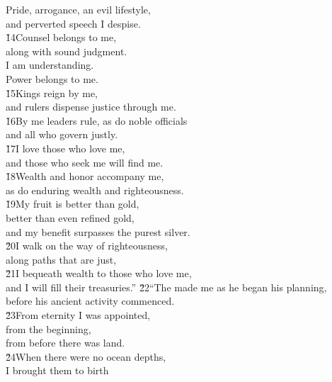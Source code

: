 \begin{poetry}
\poemll    Pride, arrogance, an evil lifestyle, \\
\poemlll       and perverted speech I despise. \\
\poeml \v{14}Counsel belongs to me, \\
\poemll    along with sound judgment. \\
\poeml I am understanding. \\
\poemll    Power belongs to me. \\
\poeml \v{15}Kings reign by me, \\
\poemll    and rulers dispense justice through me. \\
\poeml \v{16}By me leaders rule, as do noble officials \\
\poemll    and all who govern justly. \\
\poeml \v{17}I love those who love me, \\
\poemll    and those who seek me will find me. \\
\poeml \v{18}Wealth and honor accompany me, \\
\poemll    as do enduring wealth and righteousness. \\
\poeml \v{19}My fruit is better than gold, \\
\poemll    better than even refined gold, \\
\poemlll       and my benefit surpasses the purest silver. \\
\poeml \v{20}I walk on the way of righteousness, \\
\poemll    along paths that are just, \\
\poeml \v{21}I bequeath wealth to those who love me, \\
\poemll    and I will fill their treasuries.''
\poeml \v{22}``The  made me as he began his planning, \\
\poemll    before his ancient activity commenced. \\
\poeml \v{23}From eternity I was appointed, \\
\poemll    from the beginning, \\
\poemlll       from before there was land. \\
\poeml \v{24}When there were no ocean depths, \\
\poemll    I brought them to birth \\

\end{poetry}
